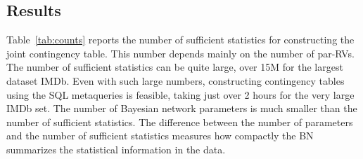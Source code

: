\documentclass{sfuthesis}
\begin{document}
\subsection{Results}
Table~\ref{tab:counts} reports the number of sufficient statistics for constructing the joint contingency table. This number depends mainly on the number of par-RVs. The number of sufficient statistics can be quite large, over 15M for the largest dataset IMDb.  Even with such large numbers, constructing contingency tables using the SQL metaqueries is feasible, taking just over 2 hours for the very large IMDb set. 
The number of Bayesian network parameters is much smaller than the number of sufficient statistics. The difference between the number of parameters and the number of sufficient statistics measures how compactly the BN summarizes the statistical information in the data. 
\end{document}
